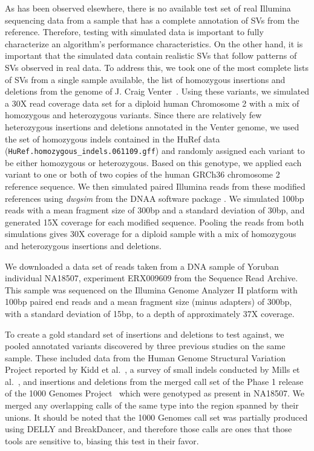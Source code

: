 As has been observed elsewhere, there is no available test set of real Illumina sequencing data from a sample that has a complete annotation of SVs from the reference. Therefore, testing with simulated data is important to fully characterize an algorithm's performance characteristics. On the other hand, it is important that the simulated data contain realistic SVs that follow patterns of SVs observed in real data. To address this, we took one of the most complete lists of SVs from a single sample available, the list of homozygous insertions and deletions from the genome of J. Craig Venter~\cite{Levy:2007fb}. Using these variants, we simulated a 30X read coverage data set for a diploid human Chromosome 2 with a mix of homozygous and heterozygous variants.  Since there are relatively few heterozygous insertions and deletions annotated in the Venter genome, we used the set of homozygous indels contained in the HuRef data (\texttt{HuRef.homozygous\_indels.061109.gff}) and randomly assigned each variant to be either homozygous or heterozygous. Based on this genotype, we applied each variant to one or both of two copies of the human GRCh36 chromosome 2 reference sequence. We then simulated paired Illumina reads from these modified references using \emph{dwgsim} from the DNAA software package \cite{DNAA}. We simulated 100bp reads with a mean fragment size of 300bp and a standard deviation of 30bp, and generated 15X coverage for each modified sequence. Pooling the reads from both simulations gives 30X coverage for a diploid sample with a mix of homozygous and heterozygous insertions and deletions.

We downloaded a data set of reads taken from a DNA sample of Yoruban individual NA18507, experiment ERX009609 from the Sequence Read Archive. This sample was sequenced on the Illumina Genome Analyzer II platform with 100bp paired end reads and a mean fragment size (minus adapters) of 300bp, with a standard deviation of 15bp, to a depth of approximately 37X coverage.

To create a gold standard set of insertions and deletions to test against, we pooled annotated variants discovered by three previous studies on the same sample. These included data from the Human Genome Structural Variation Project reported by Kidd et al.~\cite{Kidd:2008p926}, a survey of small indels conducted by Mills et al.~\cite{Mills:2011fi}, and insertions and deletions from the merged call set of the Phase 1 release of the 1000 Genomes Project~\cite{GenomesProjectConsortium:2012co} which were genotyped as present in NA18507. We merged any overlapping calls of the same type into the region spanned by their unions. It should be noted that the 1000 Genomes call set was partially produced using DELLY and BreakDancer, and therefore those calls are ones that those tools are sensitive to, biasing this test in their favor.

